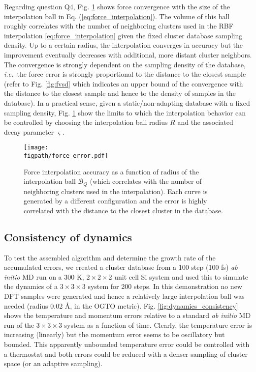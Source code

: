 \documentclass[journal=jctcce,manuscript=article]{achemso}
\newlength{\figwidth}
\newcommand{\figpath}{Figures}
\newcommand{\eref}[1]{{Eq. (\ref{#1})}}
\newcommand{\fref}[1]{{Fig. \ref{#1}}}
\newcommand{\ie}{{\it i.e.\ }}
\newcommand{\abinitio}{{\it ab initio }}
\newcommand{\Bc}{\mathcal{B}}
\begin{document}
Regarding question Q4, \fref{fig:force_interpolation} shows force convergence with the size of the interpolation ball in \eref{eq:force_interpolation}.
The volume of this ball roughly correlates with the number of neighboring clusters used in the RBF interpolation \eqref{eq:force_interpolation} given the fixed cluster database sampling density.
Up to a certain radius, the interpolation converges in accuracy but the improvement eventually decreases with additional, more distant cluster neighbors.
The convergence is strongly dependent on the sampling density of the database, \ie the force error is strongly proportional to the distance to the closest sample (refer to \fref{fig:fvsd} which indicates an upper bound of the convergence with the distance to the closest sample and hence to the density of samples in the database).
In a practical sense, given a static/non-adapting database with a fixed sampling density, \fref{fig:force_interpolation}  show the limits to which the interpolation behavior can be controlled by choosing the interpolation ball radius $R$ and the associated decay parameter $\varsigma$.

\begin{figure}[h]
{\texttt{[image: \\figpath/force\_error.pdf]}}
\caption{Force interpolation accuracy as a function of radius of the interpolation ball $\Bc_Q$ (which correlates with the number of neighboring clusters used in the interpolation). 
Each curve is generated by a different configuration and the error is highly correlated with the distance to the closest cluster in the database.
}
\label{fig:force_interpolation}
\end{figure}

\subsection{Consistency of dynamics}
To test the assembled algorithm and determine the growth rate of the accumulated errors, we created a cluster database from a 100 step (100 fs) \abinitio MD run on a 300 K, $2\!\times\!2\!\times\!2$ unit cell Si system and used this to simulate the dynamics of a $3\!\times\!3\!\times\!3$ system for 200 steps.
In this demonstration no new DFT samples were generated and hence a relatively large interpolation ball was needed (radius 0.02 \AA, in the OGTO metric). 
\fref{fig:dynamics_consistency} shows the temperature and momentum errors relative to a standard \abinitio MD run of the $3\!\times\!3\!\times\!3$  system as a function of time.
Clearly, the temperature error is increasing (linearly) but the momentum error seems to be oscillatory but bounded. 
This apparently unbounded temperature error could be controlled with a thermostat and both errors could be reduced with a denser sampling of cluster space (or an adaptive sampling).
\end{document}
